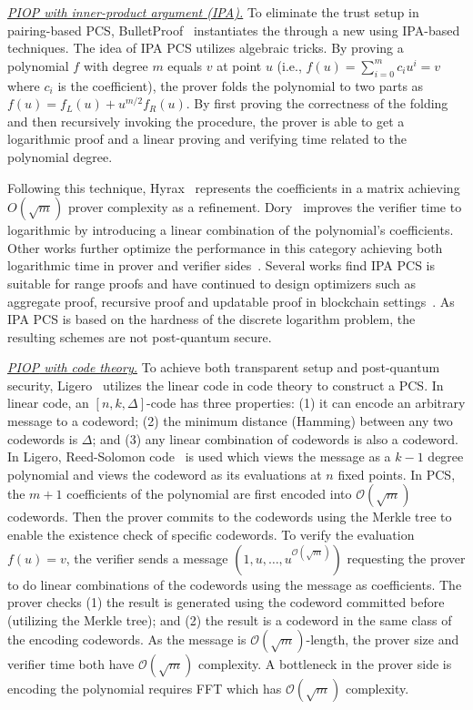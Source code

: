 \documentclass[letterpaper,twocolumn,10pt]{article}
\theoremstyle{definition}
\newcommand{\new}[1]{{#1}\xspace}
\begin{document}
\noindent\underline{\textit{{PIOP} with inner-product argument (IPA).}} 
To eliminate the trust setup in pairing-based PCS, BulletProof~\cite{bunz2018bulletproofs} instantiates the  through a new  using IPA-based techniques. \new{The idea of IPA PCS utilizes algebraic tricks. By proving a polynomial $f$ with degree $m$ equals $v$ at point $u$
	(i.e., $f(u)=\sum_{i=0}^{m}c_{i}u^{i}=v$ where $c_{i}$ is the coefficient), the prover folds the polynomial to two parts as $f(u)=f_{L}(u)+u^{m/2}f_{R}(u)$. By first proving the correctness of the folding and then recursively invoking the procedure, the prover is able to get a logarithmic proof and a linear proving and verifying time related to the polynomial degree.}

\new{Following this technique, Hyrax~\cite{wahby2018doubly} represents the coefficients in a matrix achieving $O(\sqrt{m})$ prover complexity as a refinement. Dory~\cite{lee2021dory} improves the verifier time to logarithmic by introducing a linear combination of the polynomial's coefficients. Other works further optimize the performance in this category achieving both logarithmic time in prover and verifier sides~\cite{bunz2020transparent,wang2022flashproofs,lipmaa2020succinct,arun2023dew}. Several works find IPA PCS is suitable for range proofs and have continued to design optimizers such as aggregate proof, recursive proof and updatable proof in blockchain settings~\cite{bowe2019halo,halo2,chung2022bulletproofs+,eagen2024bulletproofs++,attema2020compressed,wang2022flashproofs,daza2020updateable}. As IPA PCS is based on the hardness of the discrete logarithm problem, the resulting schemes are not post-quantum secure. 
}

\noindent\underline{\textit{{PIOP} with code theory.}} To achieve both transparent setup and post-quantum security, Ligero~\cite{ames2017ligero} utilizes the linear code in code theory to construct a PCS. \new{In linear code, an $[n,k,\Delta]$-code has three properties: (1) it can encode an arbitrary message to a codeword; (2) the minimum distance (Hamming) between any two codewords is $\Delta$; and (3) any linear combination of codewords is also a codeword.
	In Ligero, Reed-Solomon code~\cite{wicker1999reed} is used which views the message as a $k-1$ degree polynomial and views the codeword as its evaluations at $n$ fixed points. In PCS, the $m+1$ coefficients of the polynomial are first encoded into $\mathcal{O}(\sqrt{m})$ codewords. Then the prover commits to the codewords using the Merkle tree to enable the existence check of specific codewords. To verify the evaluation $f(u)=v$, the verifier sends a message $(1,u,\ldots,u^{\mathcal{O}(\sqrt{m})})$ requesting the prover to do linear combinations of the codewords using the message as coefficients. The prover checks (1) the result is generated using the codeword committed before (utilizing the Merkle tree); and (2) the result is a codeword in the same class of the encoding codewords.
	As the message is $\mathcal{O}(\sqrt{m})$-length, the prover size and verifier time both have $\mathcal{O}(\sqrt{m})$ complexity. A bottleneck in the prover side is encoding the polynomial requires FFT which has $\mathcal{O}(\sqrt{m})$ complexity.}
\end{document}
